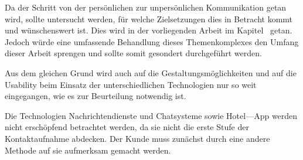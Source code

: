 Da der Schritt von der persönlichen  zur unpersönlichen Kommunikation getan wird, sollte untersucht werden, für welche Zielsetzungen dies in Betracht kommt und wünschenswert ist. Dies wird in der vorliegenden Arbeit im Kapitel~ getan. Jedoch würde eine umfassende Behandlung dieses Themenkomplexes den Umfang dieser Arbeit sprengen und sollte somit gesondert durchgeführt werden.

Aus dem gleichen Grund wird auch auf die Gestaltungsmöglichkeiten und auf die Usability beim Einsatz der unterschiedlichen Technologien nur so weit eingegangen, wie es zur Beurteilung notwendig ist.

Die Technologien Nachrichtendienste und Chatsysteme sowie Hotel––App werden nicht erschöpfend betrachtet werden, da sie nicht die erste Stufe der Kontaktaufnahme abdecken. Der Kunde muss zunächst durch eine andere Methode auf sie aufmerksam gemacht werden.
